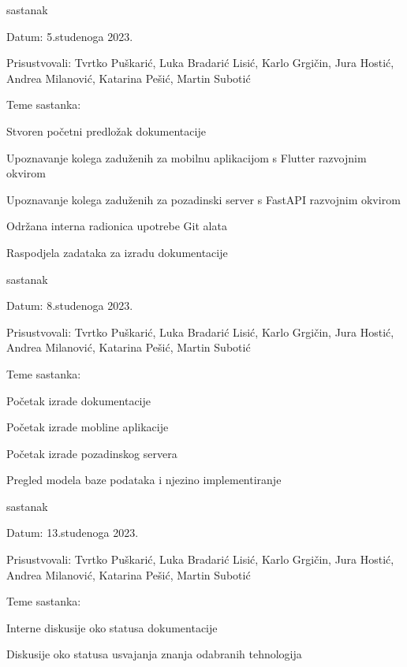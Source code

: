 \begin{packed_enum}
			\item  sastanak
			\item[] \begin{packed_item}
				\item Datum: 5.studenoga 2023.
				\item Prisustvovali: Tvrtko Puškarić, Luka Bradarić Lisić, Karlo Grgičin, Jura Hostić, Andrea Milanović, Katarina Pešić, Martin Subotić
				\item Teme sastanka:
				\begin{packed_item}
					\item Stvoren početni predložak dokumentacije
					\item Upoznavanje kolega zaduženih za mobilnu aplikacijom s Flutter razvojnim okvirom
					\item Upoznavanje kolega zaduženih za pozadinski server s FastAPI razvojnim okvirom
					\item Održana interna radionica upotrebe Git alata
					\item Raspodjela zadataka za izradu dokumentacije
				\end{packed_item}
			\end{packed_item}
			
			\item  sastanak
			\item[] \begin{packed_item}
				\item Datum: 8.studenoga 2023.
				\item Prisustvovali: Tvrtko Puškarić, Luka Bradarić Lisić, Karlo Grgičin, Jura Hostić, Andrea Milanović, Katarina Pešić, Martin Subotić
				\item Teme sastanka:
				\begin{packed_item}
					\item Početak izrade dokumentacije
					\item Početak izrade mobline aplikacije
					\item Početak izrade pozadinskog servera
					\item Pregled modela baze podataka i njezino implementiranje
				\end{packed_item}
			\end{packed_item}
			
			\item  sastanak
			\item[] \begin{packed_item}
				\item Datum: 13.studenoga 2023.
				\item Prisustvovali: Tvrtko Puškarić, Luka Bradarić Lisić, Karlo Grgičin, Jura Hostić, Andrea Milanović, Katarina Pešić, Martin Subotić
				\item Teme sastanka:
				\begin{packed_item}
					\item Interne diskusije oko statusa dokumentacije
					\item Diskusije oko statusa usvajanja znanja odabranih tehnologija
				\end{packed_item}
			\end{packed_item}
			

\end{packed_enum}
